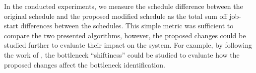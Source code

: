 In the conducted experiments, we measure the schedule difference between the original schedule
and the proposed modified schedule as the total sum off job-start differences between the schedules.
This simple metric was sufficient to compare the two presented algorithms,
however, the proposed changes could be studied further to evaluate their impact on the system.
For example, by following the work of \citet{Lawrence1994}, the bottleneck \enquote{shiftiness} could be studied
to evaluate how the proposed changes affect the bottleneck identification.
